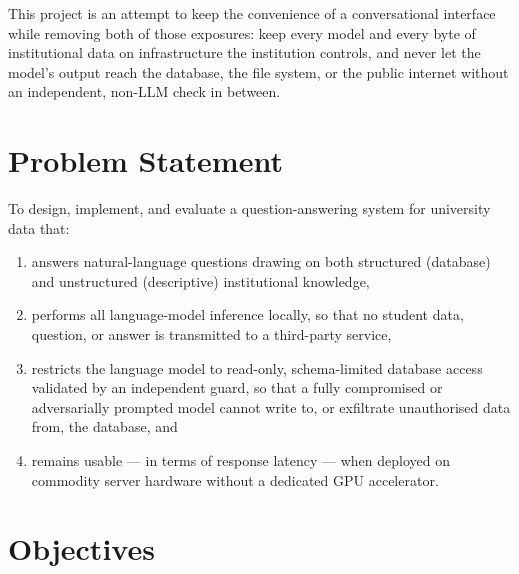\documentclass[11pt,a4paper,oneside]{report}
\begin{document}
This project is an attempt to keep the convenience of a conversational
interface while removing both of those exposures: keep every model and every
byte of institutional data on infrastructure the institution controls, and
never let the model's output reach the database, the file system, or the
public internet without an independent, non-LLM check in between.

\section{Problem Statement}

To design, implement, and evaluate a question-answering system for university
data that:
\begin{enumerate}
\item answers natural-language questions drawing on both structured
      (database) and unstructured (descriptive) institutional knowledge,
\item performs all language-model inference locally, so that no student data,
      question, or answer is transmitted to a third-party service,
\item restricts the language model to read-only, schema-limited database
      access validated by an independent guard, so that a fully compromised
      or adversarially prompted model cannot write to, or exfiltrate
      unauthorised data from, the database, and
\item remains usable --- in terms of response latency --- when deployed on
      commodity server hardware without a dedicated GPU accelerator.
\end{enumerate}

\section{Objectives}
\end{document}
